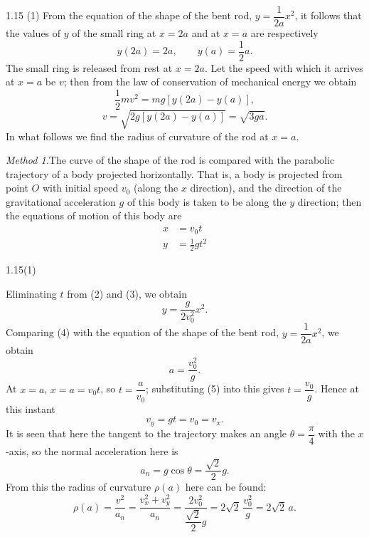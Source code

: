 \begin{solution}{1.15}
(1) From the equation of the shape of the bent rod, $y=\dfrac{1}{2a}x^2$, it follows that the values of $y$ of the small ring at $x=2a$ and at $x=a$ are respectively
\[
y(2a)=2a,\qquad y(a)=\frac{1}{2}a.
\]
The small ring is released from rest at $x=2a$. Let the speed with which it arrives at $x=a$ be $v$; then from the law of conservation of mechanical energy we obtain
\[
\frac{1}{2}mv^2=mg\left[y(2a)-y(a)\right],
\]
\begin{equation}
v=\sqrt{2g\left[y(2a)-y(a)\right]}=\sqrt{3ga}. \tag{1}
\end{equation}
In what follows we find the radius of curvature of the rod at $x=a$.

\textit{Method 1.}\quad The curve of the shape of the rod is compared with the parabolic trajectory of a body projected horizontally. That is, a body is projected from point $O$ with initial speed $v_0$ (along the $x$ direction), and the direction of the gravitational acceleration $g$ of this body is taken to be along the $y$ direction; then the equations of motion of this body are
\begin{align}
x&=v_0t \tag{2}\\
y&=\frac{1}{2}gt^2 \tag{3}
\end{align}

\begin{figbox}{1.15(1)}
\end{figbox}

Eliminating $t$ from (2) and (3), we obtain
\begin{equation}
y=\frac{g}{2v_0^2}x^2. \tag{4}
\end{equation}
Comparing (4) with the equation of the shape of the bent rod, $y=\dfrac{1}{2a}x^2$, we obtain
\begin{equation}
a=\frac{v_0^2}{g}. \tag{5}
\end{equation}
At $x=a$, $x=a=v_0t$, so $t=\dfrac{a}{v_0}$; substituting (5) into this gives $t=\dfrac{v_0}{g}$. Hence at this instant
\[
v_y=gt=v_0=v_x.
\]
It is seen that here the tangent to the trajectory makes an angle $\theta=\dfrac{\pi}{4}$ with the $x$-axis, so the normal acceleration here is
\[
a_n=g\cos\theta=\frac{\sqrt{2}}{2}g.
\]
From this the radius of curvature $\rho(a)$ here can be found:
\[
\rho(a)=\frac{v^2}{a_n}=\frac{v_x^2+v_y^2}{a_n}
=\frac{2v_0^2}{\dfrac{\sqrt{2}}{2}g}=2\sqrt{2}\,\frac{v_0^2}{g}=2\sqrt{2}\,a.
\]


\end{solution}
